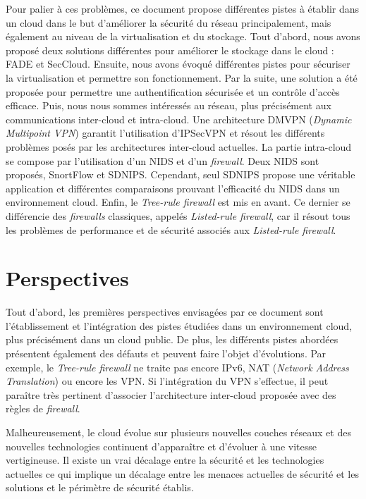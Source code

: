 Pour palier à ces problèmes, ce document propose différentes pistes à établir dans un cloud dans le but d'améliorer la sécurité du réseau principalement, mais également au niveau de la virtualisation et du stockage. Tout d'abord, nous avons proposé deux solutions différentes pour améliorer le stockage dans le cloud : FADE et SecCloud. Ensuite, nous avons évoqué différentes pistes pour sécuriser la virtualisation et permettre son fonctionnement. Par la suite, une solution a été proposée pour permettre une authentification sécurisée et un contrôle d'accès efficace. Puis, nous nous sommes intéressés au réseau, plus précisément aux communications inter-cloud et intra-cloud. Une architecture DMVPN (\textit{Dynamic Multipoint VPN}) garantit l'utilisation d'IPSecVPN et résout les différents problèmes posés par les architectures inter-cloud actuelles. La partie intra-cloud se compose par l'utilisation d'un NIDS et d'un \textit{firewall}. Deux NIDS sont proposés, SnortFlow et SDNIPS. Cependant, seul SDNIPS propose une véritable application et différentes comparaisons prouvant l'efficacité du NIDS dans un environnement cloud. Enfin, le  \textit{Tree-rule firewall} est mis en avant. Ce dernier se différencie des \textit{firewalls} classiques, appelés \textit{Listed-rule firewall}, car il résout tous les problèmes de performance et de sécurité associés aux \textit{Listed-rule firewall}.

\section{Perspectives}\label{sec:per}

Tout d'abord, les premières perspectives envisagées par ce document sont l'établissement et l'intégration des pistes étudiées dans un environnement cloud, plus précisément dans un cloud public. De plus, les différents pistes abordées présentent également des défauts et peuvent faire l'objet d'évolutions. Par exemple, le \textit{Tree-rule firewall} ne traite pas encore IPv6, NAT (\textit{Network Address Translation}) ou encore les VPN. Si l'intégration du VPN s'effectue, il peut paraître très pertinent d'associer l'architecture inter-cloud proposée avec des règles de \textit{firewall}. 

Malheureusement, le cloud évolue sur plusieurs nouvelles couches réseaux et des nouvelles technologies continuent d'apparaître et d'évoluer à une vitesse vertigineuse. Il existe un vrai décalage entre la sécurité et les technologies actuelles ce qui implique un décalage entre les menaces actuelles de sécurité et les solutions et le périmètre de sécurité établis.
